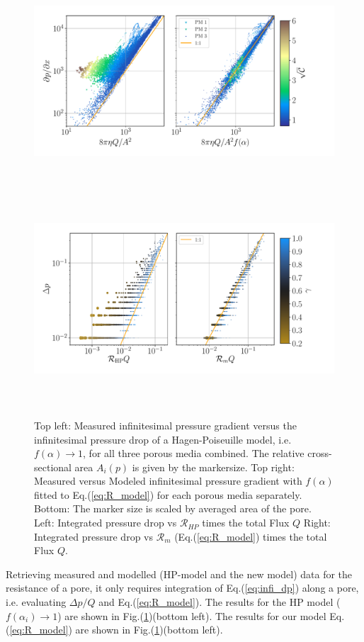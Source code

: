 \documentclass[draft]{agujournal2019}
\begin{document}
\begin{figure}
\includegraphics[height=8cm]{figures/infi_dpdx_combined.pdf}
\includegraphics[height=8cm]{figures/integral_dp_combined.pdf}
\caption{Top left: Measured infinitesimal pressure gradient versus the infinitesimal pressure drop of a Hagen-Poiseuille model, i.e. $f(\alpha)\rightarrow 1$, for all three porous media combined. The relative cross-sectional area $A_i(p)$ is given by the markersize. Top right: Measured versus Modeled infinitesimal pressure gradient with $f(\alpha)$ fitted to Eq.(\ref{eq:R_model}) for each porous media separately. Bottom: The marker size is scaled by averaged area of the pore. Left: Integrated pressure drop vs $\mathcal{R}_{HP}$ times the total Flux $Q$ Right: Integrated pressure drop vs $\mathcal{R}_m$ (Eq.(\ref{eq:R_model}) times the total Flux $Q$. }
\label{fig:local_and_integrated}
\end{figure}


Retrieving measured and modelled (HP-model and the new model) data for the resistance of a pore, it only requires integration of Eq.(\ref{eq:infi_dp}) along a pore, i.e. evaluating $\Delta p/Q$ and Eq.(\ref{eq:R_model}). The results for the HP model ($f(\alpha_i)\rightarrow1$) are shown in Fig.(\ref{fig:local_and_integrated})(bottom left). The results for our model Eq.(\ref{eq:R_model}) are shown in Fig.(\ref{fig:local_and_integrated})(bottom left).
\end{document}
